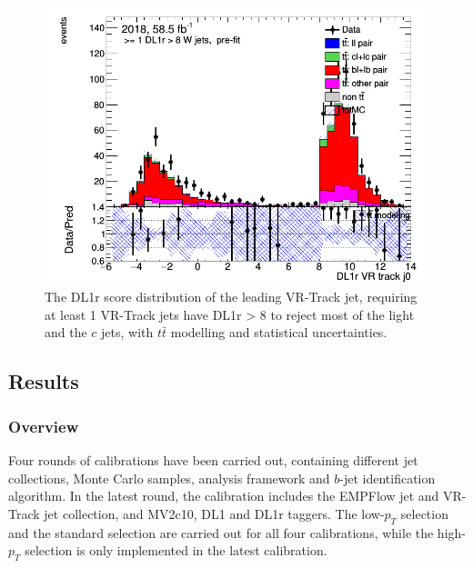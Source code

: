 \documentclass[letterpaper,12pt]{article}
\begin{document}
\begin{figure}[!h]
    \centering
\includegraphics[width=.45\textwidth]{3bplots/3bplots.png}
	\caption{The DL1r score distribution of the leading VR-Track jet, 
	requiring at least 1 VR-Track jets have DL1r > 8 to reject most of 
	the light and the $c$ jets, with $t\bar{t}$ modelling and statistical uncertainties. }
    \label{fig:3bplots}
\end{figure}


\subsection{Results}
\label{result}


\subsubsection{Overview}
Four rounds of calibrations have been carried out, containing different 
jet collections, Monte Carlo samples, analysis framework 
and $b$-jet identification algorithm. 
In the latest round, 
the calibration includes the EMPFlow jet and VR-Track jet collection, 
and MV2c10, DL1 and DL1r taggers. The low-$p_T$ 
selection and the standard selection are carried out for all four 
calibrations, while the high-$p_T$ selection is only implemented 
in the latest calibration. 
\end{document}
